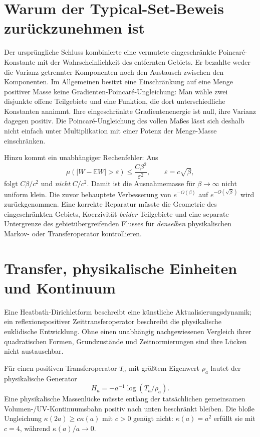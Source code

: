 \documentclass[11pt,a4paper]{article}
\theoremstyle{remark}
\begin{document}
\section{Warum der Typical-Set-Beweis zurückzunehmen ist}
Der ursprüngliche Schluss kombinierte eine
vermutete eingeschränkte Poincaré-Konstante
mit der Wahrscheinlichkeit des entfernten
Gebiets. Er bezahlte weder die Varianz
getrennter Komponenten noch den Austausch
zwischen den Komponenten.
Im Allgemeinen besitzt eine Einschränkung
auf eine Menge positiver Masse keine
Gradienten-Poincaré-Ungleichung:
Man wähle zwei disjunkte offene Teilgebiete
und eine Funktion, die dort unterschiedliche
Konstanten annimmt. Ihre eingeschränkte
Gradientenenergie ist null, ihre Varianz
dagegen positiv.
Die Poincaré-Ungleichung des vollen Maßes
lässt sich deshalb nicht einfach unter
Multiplikation mit einer Potenz der
Menge-Masse einschränken.

Hinzu kommt ein unabhängiger Rechenfehler:
Aus
\[
\mu(|W-\mathbb EW|>\varepsilon)
\le\frac{C\beta^2}{\varepsilon^2},
\qquad \varepsilon=c\sqrt\beta,
\]
folgt $C\beta/c^2$ und \emph{nicht} $C/c^2$.
Damit ist die Ausnahmemasse für
$\beta\to\infty$ nicht uniform klein.
Die zuvor behauptete Verbesserung von
$e^{-O(\beta)}$ auf $e^{-O(\sqrt\beta)}$
wird zurückgenommen.
Eine korrekte Reparatur müsste
die Geometrie des eingeschränkten Gebiets,
Koerzivität \emph{beider} Teilgebiete und
eine separate Untergrenze des
gebietübergreifenden Flusses für
\emph{denselben} physikalischen Markov-
oder Transferoperator kontrollieren.

\section{Transfer, physikalische Einheiten und Kontinuum}
Eine Heatbath-Dirichletform beschreibt
eine künstliche Aktualisierungsdynamik;
ein reflexionspositiver Zeittransferoperator
beschreibt die physikalische euklidische
Entwicklung. Ohne einen unabhängig
nachgewiesenen Vergleich ihrer quadratischen
Formen, Grundzustände und Zeitnormierungen
sind ihre Lücken nicht austauschbar.

Für einen positiven Transferoperator $T_a$
mit größtem Eigenwert $\rho_a$ lautet
der physikalische Generator
\[
H_a=-a^{-1}\log(T_a/\rho_a).
\]
Eine physikalische Massenlücke müsste entlang
der tatsächlichen gemeinsamen
Volumen-/UV-Kontinuumsbahn positiv
nach unten beschränkt bleiben.
Die bloße Ungleichung
$\kappa(2a)\ge c\kappa(a)$
mit $c>0$ genügt nicht:
$\kappa(a)=a^2$ erfüllt sie mit $c=4$,
während $\kappa(a)/a\to0$.
\end{document}
